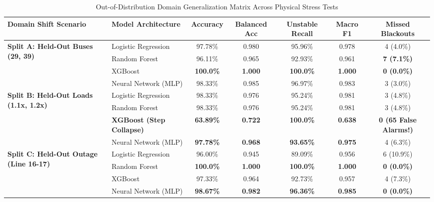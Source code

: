 \documentclass[journal]{IEEEtran}
\begin{document}
\begin{table}[t]
\centering
\caption{Out-of-Distribution Domain Generalization Matrix Across Physical Stress Tests}
\label{tab:ood}
\setlength{\tabcolsep}{8pt}
\begin{tabular}{llccccc}
\toprule
\textbf{Domain Shift Scenario} & \textbf{Model Architecture} & \textbf{Accuracy} & \textbf{Balanced Acc} & \textbf{Unstable Recall} & \textbf{Macro F1} & \textbf{Missed Blackouts} \\
\midrule
\multirow{4}{*}{\textbf{Split A: Held-Out Buses (29, 39)}} 
 & Logistic Regression & 97.78\% & 0.980 & 95.96\% & 0.978 & 4 (4.0\%) \\
 & Random Forest & 96.11\% & 0.965 & 92.93\% & 0.961 & \textbf{7 (7.1\%)} \\
 & XGBoost & \textbf{100.0\%} & \textbf{1.000} & \textbf{100.0\%} & \textbf{1.000} & \textbf{0 (0.0\%)} \\
 & Neural Network (MLP) & 98.33\% & 0.985 & 96.97\% & 0.983 & 3 (3.0\%) \\
\midrule
\multirow{4}{*}{\textbf{Split B: Held-Out Loads (1.1x, 1.2x)}} 
 & Logistic Regression & 98.33\% & 0.976 & 95.24\% & 0.981 & 3 (4.8\%) \\
 & Random Forest & 98.33\% & 0.976 & 95.24\% & 0.981 & 3 (4.8\%) \\
 & \textbf{XGBoost (Step Collapse)} & \textbf{63.89\%} & \textbf{0.722} & \textbf{100.0\%} & \textbf{0.638} & \textbf{0 (65 False Alarms!)} \\
 & Neural Network (MLP) & \textbf{97.78\%} & \textbf{0.968} & \textbf{93.65\%} & \textbf{0.975} & 4 (6.3\%) \\
\midrule
\multirow{4}{*}{\textbf{Split C: Held-Out Outage (Line 16-17)}} 
 & Logistic Regression & 96.00\% & 0.945 & 89.09\% & 0.956 & 6 (10.9\%) \\
 & Random Forest & \textbf{100.0\%} & \textbf{1.000} & \textbf{100.0\%} & \textbf{1.000} & \textbf{0 (0.0\%)} \\
 & XGBoost & 97.33\% & 0.964 & 92.73\% & 0.957 & 4 (7.3\%) \\
 & Neural Network (MLP) & \textbf{98.67\%} & \textbf{0.982} & \textbf{96.36\%} & \textbf{0.985} & \textbf{0 (0.0\%)} \\
\bottomrule
\end{tabular}
\end{table}
\end{document}
